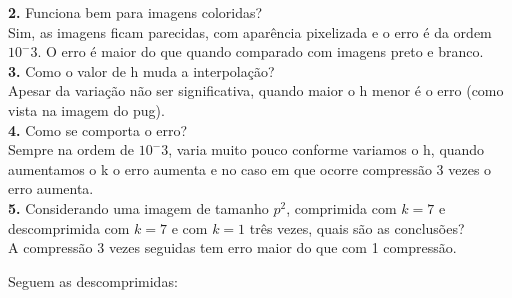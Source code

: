 \documentclass[12pt,letterpaper]{article}
\begin{document}
    \textbf{2.} Funciona bem para imagens coloridas?\\

    Sim, as imagens ficam parecidas, com aparência pixelizada e o erro é da ordem $10^-3$. O erro é maior do que quando comparado com imagens preto e branco.\\
    \textbf{3.} Como o valor de h muda a interpolação?\\

    Apesar da variação não ser significativa, quando maior o h menor é o erro (como vista na imagem do pug).\\

    \textbf{4.} Como se comporta o erro?\\

    Sempre na ordem de $10^-3$, varia muito pouco conforme variamos o h, quando aumentamos o k o erro aumenta e no caso em que ocorre compressão 3 vezes o erro aumenta.\\

    \textbf{5.} Considerando uma imagem de tamanho $p^2$, comprimida com $k = 7$ e descomprimida com $k = 7$ e com $k = 1$ três vezes, quais são as conclusões?\\
    A compressão 3 vezes seguidas tem erro maior do que com 1 compressão.


    Seguem as descomprimidas:

    \begin{figure}[h]
    \end{figure}

    \begin{figure}[h]
    \end{figure}

    \begin{figure}[h]
    \end{figure}

    \begin{figure}[h]
    \end{figure}
\end{document}
